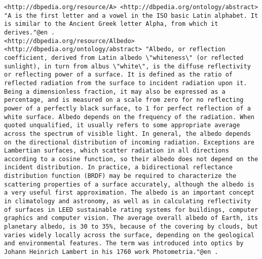 \begin{lstlisting}[breaklines, basicstyle=\small]
<http://dbpedia.org/resource/A> <http://dbpedia.org/ontology/abstract> "A is the first letter and a vowel in the ISO basic Latin alphabet. It is similar to the Ancient Greek letter Alpha, from which it derives."@en .
<http://dbpedia.org/resource/Albedo> <http://dbpedia.org/ontology/abstract> "Albedo, or reflection coefficient, derived from Latin albedo \"whiteness\" (or reflected sunlight), in turn from albus \"white\", is the diffuse reflectivity or reflecting power of a surface. It is defined as the ratio of reflected radiation from the surface to incident radiation upon it. Being a dimensionless fraction, it may also be expressed as a percentage, and is measured on a scale from zero for no reflecting power of a perfectly black surface, to 1 for perfect reflection of a white surface. Albedo depends on the frequency of the radiation. When quoted unqualified, it usually refers to some appropriate average across the spectrum of visible light. In general, the albedo depends on the directional distribution of incoming radiation. Exceptions are Lambertian surfaces, which scatter radiation in all directions according to a cosine function, so their albedo does not depend on the incident distribution. In practice, a bidirectional reflectance distribution function (BRDF) may be required to characterize the scattering properties of a surface accurately, although the albedo is a very useful first approximation. The albedo is an important concept in climatology and astronomy, as well as in calculating reflectivity of surfaces in LEED sustainable rating systems for buildings, computer graphics and computer vision. The average overall albedo of Earth, its planetary albedo, is 30 to 35%, because of the covering by clouds, but varies widely locally across the surface, depending on the geological and environmental features. The term was introduced into optics by Johann Heinrich Lambert in his 1760 work Photometria."@en .
\end{lstlisting}

